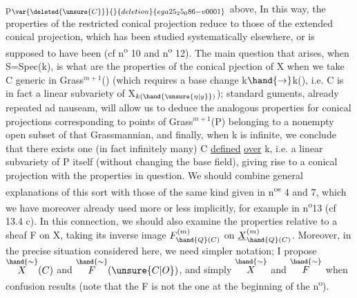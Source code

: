 
p$_{\var{\deleted{\unsure{C}}}{}{deletion}{ega25_25_086-v0001}}$ above, 
 In this way, the properties of
the restricted conical projection reduce  to
those of the extended conical projection, which has been studied systematically
elsewhere, or is supposed to have been (cf n\textsuperscript{o} 10 and n\textsuperscript{o} 12). The
main question that arises, when S=Spec(k), is what are
the properties of the conical pjection of X when we take C generic
in Grass$^{m+1}$() (which requires a base change
k$\hand{\rightarrow}$k(), i.e. C is  in fact a linear subvariety of X$_{k(\hand{\unsure{\eta|y}})}$); standard
guments, already repeated ad nauseam, will allow us to deduce
the analogous properties for conical projections corresponding to 
points of Grass$^{m+1}$(P) belonging to a nonempty open subset of that
Grassmannian, and finally, when k is infinite, we conclude that there exists
one (in fact infinitely many)   C \uline{defined} \uline{over} k, i.e. a linear
subvariety of P itself (without changing the base field), giving rise
to a conical projection with the properties in question. We should
 combine general explanations of this sort with those of the same
kind given in n\textsuperscript{os} 4 and 7, which we have moreover already
used more or less implicitly, for example in n\textsuperscript{o}13 
 (cf 13.4 c). In this connection, we should also examine the
properties relative to a sheaf F on X, taking its inverse image
$F^{(m)}_{\hand{Q}(C)}$ on $\underline{X}^{(m)}_{\hand{Q}(C)}$. Moreover, in the precise situation
considered here, we need simpler notation; I propose $\overset{\hand{\sim}}{X}(C)$ and $\overset{\hand{\sim}}{F}(\unsure{C|O})$,
and simply $\overset{\hand{\sim}}{X}$ and $\overset{\hand{\sim}}{F}$ when  confusion results (note that the
F   is not the one at the beginning of the n\textsuperscript{o}).

